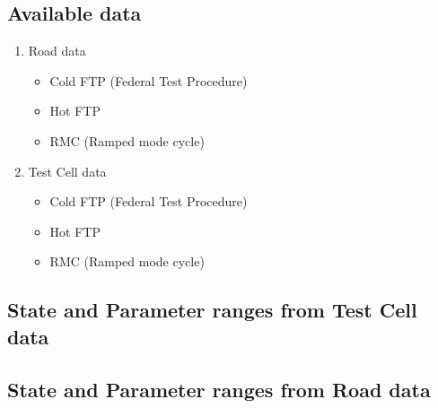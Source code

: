 \subsection{Available data}
\begin{enumerate}
    \item Road data
    \begin{itemize}
        \item Cold FTP (Federal Test Procedure)
        \item Hot FTP
        \item RMC (Ramped mode cycle)
    \end{itemize}
    \item Test Cell data
    \begin{itemize}
        \item Cold FTP (Federal Test Procedure)
        \item Hot FTP
        \item RMC (Ramped mode cycle)
    \end{itemize}

\end{enumerate}


\subsection{State and Parameter ranges from Test Cell data}

\subsection{State and Parameter ranges from Road data}
